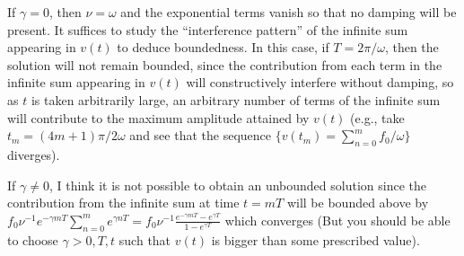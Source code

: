\documentclass[11pt]{article}
\begin{document}
\begin{enumerate}
\begin{enumerate}[label=(\roman*)]
        If $\gamma = 0$, then $\nu = \omega$ and the exponential terms vanish so that no damping will be present. It suffices to study the ``interference pattern'' of the infinite sum appearing in $v(t)$ to deduce boundedness. In this case, if $T = 2\pi/\omega$, then the solution will not remain bounded, since the contribution from each term in the infinite sum appearing in $v(t)$ will constructively interfere without damping, so as $t$ is taken arbitrarily large, an arbitrary number of terms of the infinite sum will contribute to the maximum amplitude attained by $v(t)$ (e.g., take $t_m = (4m+1)\pi/2\omega$ and see that the sequence $\{v(t_m) = \sum_{n=0}^m f_0/\omega\}$ diverges).

        If $\gamma\neq 0$, I think it is not possible to obtain an unbounded solution since the contribution from the infinite sum at time $t = mT$ will be bounded above by $f_0\nu^{-1}e^{-\gamma m T}\sum_{n=0}^me^{\gamma n T} = f_0\nu^{-1}\frac{e^{-\gamma m T}-e^{\gamma T}}{1-e^{\gamma T}}$ which converges (But you should be able to choose $\gamma>0,T,t$ such that $v(t)$ is bigger than some prescribed value).
    \end{enumerate}

    \hrulefill


\end{enumerate}
\end{document}
